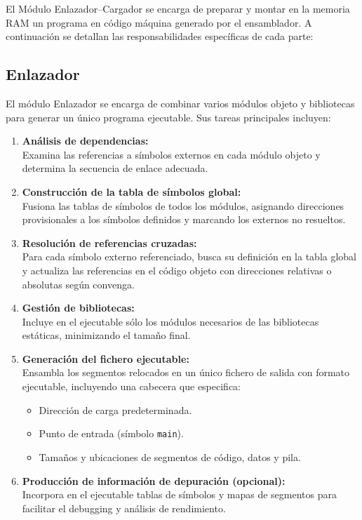 \documentclass{article}
\begin{document}
El Módulo Enlazador–Cargador se encarga de preparar y montar en la memoria RAM un programa en código máquina generado por el ensamblador. A continuación se detallan las responsabilidades específicas de cada parte:
\subsection{Enlazador}

El módulo Enlazador se encarga de combinar varios módulos objeto y bibliotecas para generar un único programa ejecutable. Sus tareas principales incluyen:

\begin{enumerate}
\item \textbf{Análisis de dependencias:}\\
Examina las referencias a símbolos externos en cada módulo objeto y determina la secuencia de enlace adecuada.

\item \textbf{Construcción de la tabla de símbolos global:}\\
Fusiona las tablas de símbolos de todos los módulos, asignando direcciones provisionales a los símbolos definidos y marcando los externos no resueltos.

\item \textbf{Resolución de referencias cruzadas:}\\
Para cada símbolo externo referenciado, busca su definición en la tabla global y actualiza las referencias en el código objeto con direcciones relativas o absolutas según convenga.

\item \textbf{Gestión de bibliotecas:}\\
Incluye en el ejecutable sólo los módulos necesarios de las bibliotecas estáticas, minimizando el tamaño final.

\item \textbf{Generación del fichero ejecutable:}\\
Ensambla los segmentos relocados en un único fichero de salida con formato ejecutable, incluyendo una cabecera que especifica:
\begin{itemize}
\item Dirección de carga predeterminada.
\item Punto de entrada (símbolo \texttt{main}).
\item Tamaños y ubicaciones de segmentos de código, datos y pila.
\end{itemize}

\item \textbf{Producción de información de depuración (opcional):}\\
Incorpora en el ejecutable tablas de símbolos y mapas de segmentos para facilitar el debugging y análisis de rendimiento.
\end{enumerate}
\end{document}
